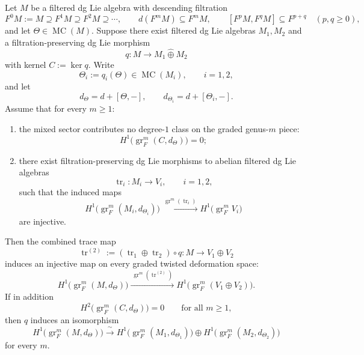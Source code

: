 \begin{proposition}
\label{prop:frontier-two-channel-graded-trace-detection}
Let $M$ be a filtered dg Lie algebra with descending filtration
\[
F^0M:=M \supseteq F^1M \supseteq F^2M \supseteq \cdots,
\qquad
 d(F^mM)\subseteq F^mM,
\qquad
 [F^pM,F^qM]\subseteq F^{p+q}
\quad (p,q\ge 0),
\]
and let $\Theta\in\operatorname{MC}(M)$.
Suppose there exist filtered dg Lie algebras $M_1,M_2$ and a
filtration-preserving dg Lie morphism
\[
q\colon M\longrightarrow M_1\widehat\oplus M_2
\]
with kernel $C:=\ker q$.
Write
\[
\Theta_i:=q_i(\Theta)\in\operatorname{MC}(M_i),
\qquad i=1,2,
\]
and let
\[
d_{\Theta}=d+[\Theta,-],
\qquad
 d_{\Theta_i}=d+[\Theta_i,-].
\]
Assume that for every $m\ge 1$:
\begin{enumerate}[label=\textup{(\roman*)}]
\item the mixed sector contributes no degree-$1$ class on the graded
  genus-$m$ piece:
  \[
  H^1\!\bigl(\operatorname{gr}_F^m(C,d_{\Theta})\bigr)=0;
  \]
\item there exist filtration-preserving dg Lie morphisms to abelian
  filtered dg Lie algebras
  \[
  \operatorname{tr}_i\colon M_i\longrightarrow V_i,
  \qquad i=1,2,
  \]
  such that the induced maps
  \[
  H^1\!\bigl(\operatorname{gr}_F^m(M_i,d_{\Theta_i})\bigr)
  \xrightarrow{\ \operatorname{gr}^m(\operatorname{tr}_i)\ }
  H^1\!\bigl(\operatorname{gr}_F^mV_i\bigr)
  \]
  are injective.
\end{enumerate}
Then the combined trace map
\[
\operatorname{tr}^{(2)}:=(\operatorname{tr}_1\oplus \operatorname{tr}_2)\circ q
\colon M\longrightarrow V_1\oplus V_2
\]
induces an injective map on every graded twisted deformation space:
\[
H^1\!\bigl(\operatorname{gr}_F^m(M,d_{\Theta})\bigr)
\xrightarrow{\ \operatorname{gr}^m(\operatorname{tr}^{(2)})\ }
H^1\!\bigl(\operatorname{gr}_F^m(V_1\oplus V_2)\bigr).
\]
If in addition
\[
H^2\!\bigl(\operatorname{gr}_F^m(C,d_{\Theta})\bigr)=0
\qquad \text{for all }m\ge 1,
\]
then $q$ induces an isomorphism
\[
H^1\!\bigl(\operatorname{gr}_F^m(M,d_{\Theta})\bigr)
\xrightarrow{\ \sim\ }
H^1\!\bigl(\operatorname{gr}_F^m(M_1,d_{\Theta_1})\bigr)
\oplus
H^1\!\bigl(\operatorname{gr}_F^m(M_2,d_{\Theta_2})\bigr)
\]
for every $m$.
\end{proposition}

